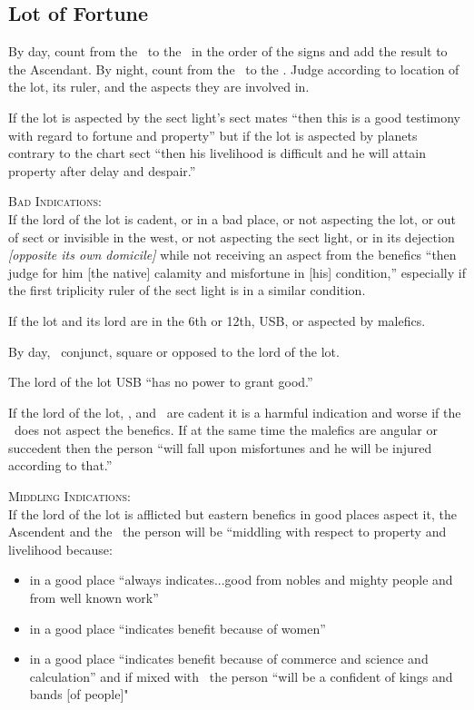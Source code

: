 \subsection{Lot of Fortune}
By day, count from the \Sun\, to the \Moon\, in the order of the signs and add the result to the Ascendant. By night, count from the \Moon\, to the \Sun. Judge according to location of the lot, its ruler, and the aspects they are involved in.

If the lot is aspected by the sect light's sect mates ``then this is a good testimony with regard to fortune and property'' but if the lot is aspected by planets contrary to the chart sect ``then his livelihood is difficult and he will attain property after delay and despair.''

\noindent\textsc{Bad Indications:} \hfill \\
\indent If the lord of the lot is cadent, or in a bad place, or not aspecting the lot, or out of sect or invisible in the west,  or not aspecting the sect light, or in its dejection \textsl{[opposite its own domicile]} while not receiving an aspect from the benefics ``then judge for him [the native] calamity and misfortune in [his] condition,'' especially if the first triplicity ruler of the sect light is in a similar condition.

If the lot and its lord are in the 6th or 12th, USB, or aspected by malefics.

By day, \Mars\, conjunct, square or opposed to the lord of the lot.

The lord of the lot USB ``has no power to grant good.''

If the lord of the lot, \Jupiter, and \Venus\, are cadent it is a harmful indication and worse if the \Moon\, does not aspect the benefics. If at the same time the malefics are angular or succedent then the person ``will fall upon misfortunes and he will be injured according to that.''

\noindent\textsc{Middling Indications:} \hfill \\
If the lord of the lot is afflicted but eastern benefics in good places aspect it, the Ascendent and the \Moon\, the person will be ``middling with respect to property and livelihood because:
\begin{itemize}[topsep=0em,itemsep=0em]
\item[\Jupiter] in a good place ``always indicates...good from nobles and mighty people and from well known work''
\item[\Venus] in a good place ``indicates benefit because of women''
\item[\Mercury] in a good place ``indicates benefit because of commerce and science and calculation'' and if mixed with \Jupiter\, the person ``will be a confident of kings and bands [of people]"
\end{itemize}

